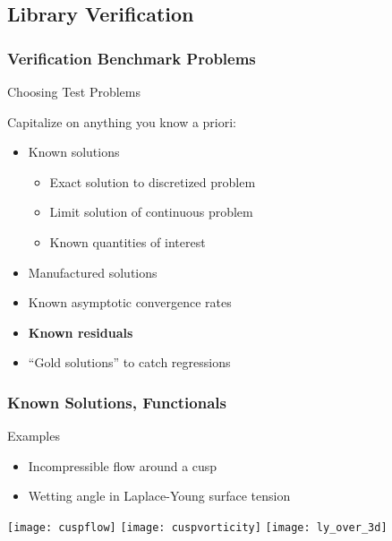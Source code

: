 \subsection{Library Verification}

\begin{frame}
\frametitle{Verification Benchmark Problems}
\begin{block}{Choosing Test Problems}

Capitalize on anything you know a priori:

\begin{itemize}
\item Known solutions
\begin{itemize}
\item Exact solution to discretized problem
\item Limit solution of continuous problem
\item Known quantities of interest
\end{itemize}
\item Manufactured solutions
\item Known asymptotic convergence rates
\item {\bf Known residuals}
\item ``Gold solutions'' to catch regressions
\end{itemize}
\end{block}
\end{frame}

\begin{frame}
\frametitle{Known Solutions, Functionals}
\begin{block}{Examples}
\begin{itemize}
\item Incompressible flow around a cusp
\item Wetting angle in Laplace-Young surface tension
\end{itemize}
\end{block}

\texttt{[image: cuspflow]}
\texttt{[image: cuspvorticity]}
\texttt{[image: ly\_over\_3d]}

\end{frame}

